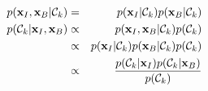 \begin{eqnarray}
\nonumber p({\bf x}_{I}, {\bf x}_{B} | {\cal C}_k) &=& p({\bf x}_{I} | {\cal C}_k)p({\bf x}_{B} | {\cal C}_k) \\
\nonumber p({\cal C}_{k} | {\bf x}_{I}, {\bf x}_{B}) & \propto & p({\bf x}_{I}, {\bf x}_{B} | {\cal C}_k)p({\cal C}_{k}) \\
\nonumber                                            & \propto & p({\bf x}_{I} | {\cal C}_k)p({\bf x}_{B} | {\cal C}_k)p({\cal C}_{k}) \\
\nonumber                                            & \propto & \frac{p({\cal C}_{k} | {\bf x}_{I})p({\cal C}_{k} | {\bf x}_{B})}{p({\cal C}_{k})}
\end{eqnarray}
